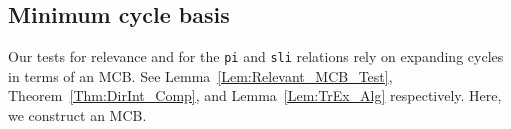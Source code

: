 \documentclass[fleqn,11pt]{article}
\begin{document}
%
%
%
%
%
%
%
%
%
%
%
%
%
%
%

\subsection{Minimum cycle basis}
\label{sub:MCB_comp}


Our tests for relevance and for the {\tt pi} and {\tt sli} relations rely on expanding cycles in terms of an MCB. See Lemma~\ref{Lem:Relevant_MCB_Test}, Theorem~\ref{Thm:DirInt_Comp}, and Lemma~\ref{Lem:TrEx_Alg} respectively. 
Here, we construct an MCB.
\end{document}
